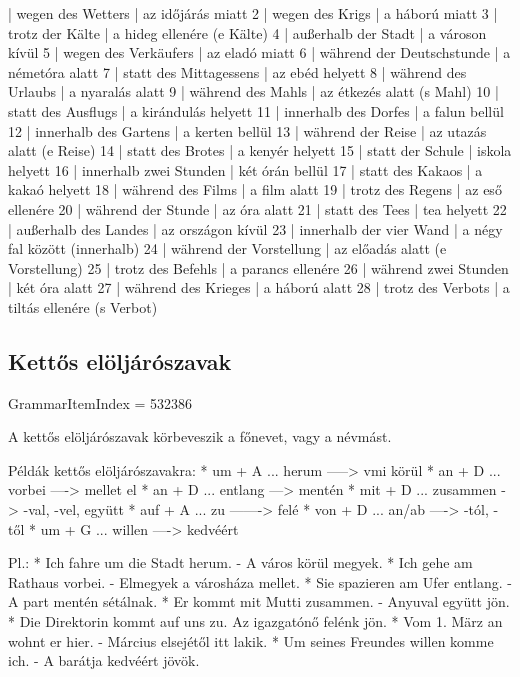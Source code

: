 \documentclass{article}
\newenvironment{desc}{\verbatim}{\endverbatim}
\newenvironment{exmp}{\verbatim}{\endverbatim}
\begin{document}
\begin{exmp}
1 | wegen des Wetters | az időjárás miatt
2 | wegen des Krigs | a háború miatt
3 | trotz der Kälte | a hideg ellenére (e Kälte)
4 | außerhalb der Stadt | a városon kívül
5 | wegen des Verkäufers | az eladó miatt
6 | während der Deutschstunde | a németóra alatt
7 | statt des Mittagessens | az ebéd helyett
8 | während des Urlaubs | a nyaralás alatt
9 | während des Mahls | az étkezés alatt (s Mahl)
10 | statt des Ausflugs | a kirándulás helyett
11 | innerhalb des Dorfes | a falun bellül
12 | innerhalb des Gartens | a kerten bellül
13 | während der Reise | az utazás alatt (e Reise)
14 | statt des Brotes | a kenyér helyett
15 | statt der Schule | iskola helyett
16 | innerhalb zwei Stunden | két órán bellül
17 | statt des Kakaos | a kakaó helyett
18 | während des Films | a film alatt
19 | trotz des Regens | az eső ellenére
20 | während der Stunde | az óra alatt
21 | statt des Tees | tea helyett
22 | außerhalb des Landes | az országon kívül
23 | innerhalb der vier Wand | a négy fal között (innerhalb)
24 | während der Vorstellung | az előadás alatt (e Vorstellung)
25 | trotz des Befehls | a parancs ellenére
26 | während zwei Stunden | két óra alatt
27 | während des Krieges | a háború alatt
28 | trotz des Verbots | a tiltás ellenére (s Verbot)
\end{exmp}

\subsection{Kettős elöljárószavak}

GrammarItemIndex = 532386

\begin{desc}
A kettős elöljárószavak körbeveszik a főnevet, vagy a névmást.

Példák kettős elöljárószavakra:
* um + A ... herum -----> vmi körül
* an + D ... vorbei ----> mellet el
* an + D ... entlang ---> mentén
* mit + D ... zusammen -> -val, -vel, együtt
* auf + A ... zu -------> felé
* von + D ... an/ab ----> -tól, -től
* um + G ... willen ----> kedvéért

Pl.: * Ich fahre um die Stadt herum. - A város körül megyek.
* Ich gehe am Rathaus vorbei. - Elmegyek a városháza mellet.
* Sie spazieren am Ufer entlang. - A part mentén sétálnak.
* Er kommt mit Mutti zusammen. - Anyuval együtt jön.
* Die Direktorin kommt auf uns zu. Az igazgatónő felénk jön.
* Vom 1. März an wohnt er hier. - Március elsejétől itt lakik.
* Um seines Freundes willen komme ich. - A barátja kedvéért jövök.
\end{desc}
\end{document}

